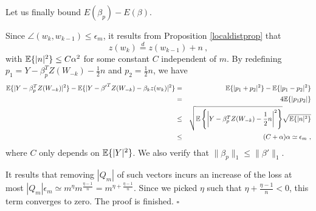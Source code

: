 Let us finally bound $E(\beta_p) - E(\beta)$. 

Since $\angle(w_k,w_{k-1}) \leq \epsilon_m $, 
it results from Proposition \ref{localdistprop} that 
$$z(w_k) \stackrel{d}{=}  z(w_{k-1}) + n~,$$
with ${\mathbb{E}}\{|n|^2\} \leq C\alpha^2$ for some constant $C$ independent of $m$. 
By redefining $p_1 = Y - \beta_p^T Z(W_{-k}) - \frac{1}{2} n$ and 
$p_2 = \frac{1}{2}n$, we have 
\begin{eqnarray*}
{\mathbb{E}} \{ | Y - \beta_p^T Z(W_{-k}) |^2 \} - {\mathbb{E}} \{ | Y - {\beta'}^T Z(W_{-k}) - \beta_k z(w_k) |^2 \} & = & {\mathbb{E}}\{ | p_1 + p_2 |^2 \} - {\mathbb{E}} \{ |p_1 - p_2 |^2 \} \\
&=& 4{\mathbb{E}} \{ |p_1 p_2| \} \\
&\leq& \sqrt{ {\mathbb{E}}\left\{ \left|Y - \beta_p^T Z(W_{-k}) - \frac{1}{2} n \right|^2 \right\} } \sqrt{ {\mathbb{E}} \{ |n|^2 \} } \\
&\leq & (C+\alpha) \alpha \simeq \epsilon_m~,
\end{eqnarray*}
where $C$ only depends on ${\mathbb{E}}\{|Y|^2\}$. We also verify that $\| \beta_p\|_1 \leq \| \beta'\|_1$.

It results that removing $|Q_m|$ of such vectors incurs an increase of the loss at most 
$|Q_m| \epsilon_m \simeq m^\eta m^{\frac{\eta-1}{n} } = m^{\eta + \frac{\eta-1}{n}}$. 
Since we picked $\eta$ such that $\eta + \frac{\eta-1}{n} <0$, this term converges to zero. The proof is finished. $\square$

%
%
%
%
%




